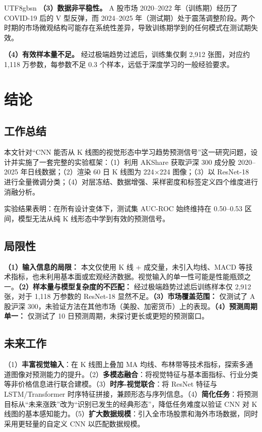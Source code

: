 \documentclass[12pt,a4paper]{article}
\begin{document}
\begin{CJK}{UTF8}{gbsn}
\textbf{（3）数据非平稳性。} A 股市场 2020--2022 年（训练期）经历了 COVID-19 后的 V 型反弹，而 2024--2025 年（测试期）处于震荡调整阶段。两个时期的市场微观结构可能存在系统性差异，导致训练期学到的任何模式在测试期失效。

\textbf{（4）有效样本量不足。} 经过极端趋势过滤后，训练集仅剩 2,912 张图，对应约 1,118 万参数，每参数不足 0.3 个样本，远低于深度学习的一般经验要求。

\section{结论}

\subsection{工作总结}

本文针对``CNN 能否从 K 线图的视觉形态中学习趋势预测信号''这一研究问题，设计并实施了一套完整的实验框架：（1）利用 AKShare 获取沪深 300 成分股 2020--2025 年日线数据；（2）渲染 60 日 K 线图为 224$\times$224 图像；（3）以 ResNet-18 进行全量微调分类；（4）对层冻结、数据增强、采样密度和标签定义四个维度进行消融分析。

实验结果表明：在所有设计变体下，测试集 AUC-ROC 始终维持在 0.50--0.53 区间，模型无法从纯 K 线形态中学到有效的预测信号。

\subsection{局限性}

\textbf{（1）输入信息的局限：} 本文仅使用 K 线 + 成交量，未引入均线、MACD 等技术指标，也未利用基本面或宏观经济数据。视觉输入的单一性可能是性能瓶颈之一。\textbf{（2）样本量与模型复杂度的不匹配：} 经过极端趋势过滤后训练样本仅 2,912 张，对于 1,118 万参数的 ResNet-18 显然不足。\textbf{（3）市场覆盖范围：} 仅测试了 A 股沪深 300，未验证方法在其他市场（美股、加密货币）上的表现。\textbf{（4）预测周期单一：} 仅测试了 10 日预测周期，未探讨更长或更短的预测窗口。

\subsection{未来工作}

（1）\textbf{丰富视觉输入}：在 K 线图上叠加 MA 均线、布林带等技术指标，探索多通道图像对预测能力的提升。（2）\textbf{多模态融合}：将视觉特征与基本面指标、行业分类等非价格信息进行联合建模。（3）\textbf{时序-视觉联合}：将 ResNet 特征与 LSTM/Transformer 时序特征拼接，兼顾形态与序列信息。（4）\textbf{简化任务}：将预测目标从``未来涨跌''改为``识别已发生的经典形态''，降低任务难度以验证 CNN 对 K 线图的基本感知能力。（5）\textbf{扩大数据规模}：引入全市场股票和海外市场数据，同时采用更轻量的自定义 CNN 以匹配数据规模。


\end{CJK}
\end{document}
